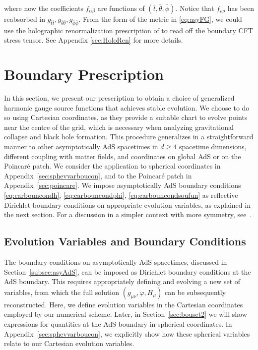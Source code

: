 \documentclass[a4paper,11pt]{article}
\numberwithin{equation}{section}
\begin{document}
where now the coefficients $f_{\alpha\beta}$ are functions of $(\bar t, \bar\theta, \bar\phi)$. 
Notice that $f_{\rho\rho}$ has been reabsorbed in $g_{\bar{t}\bar{t}}, g_{\bar{\theta}\bar{\theta}}, g_{\bar{\phi}\bar{\phi}}$. From the form of the metric in \eqref{eq:asyFG}, we could use the holographic renormalization prescription of \cite{deHaro:2000vlm} to read off the boundary CFT stress tensor. See Appendix \ref{sec:HoloRen} for more details.



\section{Boundary Prescription}\label{sec:pre_sta}

In this section, we present our prescription to obtain a choice of generalized harmonic gauge source functions that achieves stable evolution.
We choose to do so using Cartesian coordinates, as they provide a suitable chart to evolve points near the centre of the grid, which is necessary when analyzing gravitational collapse and black hole formation. 
This procedure generalizes in a straightforward manner to other asymptotically AdS spacetimes in $d\geq 4$ spacetime dimensions, different coupling with matter fields, and coordinates on global AdS or on the Poincar\'{e} patch. We consider the application to spherical coordinates in Appendix~\ref{sec:sphevvarboucon}, and to the Poincar\'e patch in Appendix~\ref{sec:poincare}.
We impose asymptotically AdS boundary conditions \eqref{eq:carbouncondh}, \eqref{eq:carbouncondphi}, \eqref{eq:carbouncondsoufun} as reflective Dirichlet boundary conditions on appropriate evolution variables, as explained in the next section.
For a discussion in a simpler context with more symmetry, see~\cite{Bantilan:2012vu}.

\subsection{Evolution Variables and Boundary Conditions}\label{subsec:cartevvarboucon}

The boundary conditions on asymptotically AdS spacetimes, discussed in Section~\ref{subsec:asyAdS}, can be imposed as Dirichlet boundary conditions at the AdS boundary.
This requires appropriately defining and evolving a new set of variables, from which the full solution $(g_{\mu\nu},\varphi,H_\mu)$ can be subsequently reconstructed. 
Here, we define evolution variables in the Cartesian coordinates employed by our numerical scheme.
Later, in Section~\ref{sec:bouset2} we will show expressions for quantities at the AdS boundary in spherical coordinates.
In Appendix~\ref{sec:sphevvarboucon}, we explicitly show how these spherical variables relate to our Cartesian evolution variables.
\end{document}
